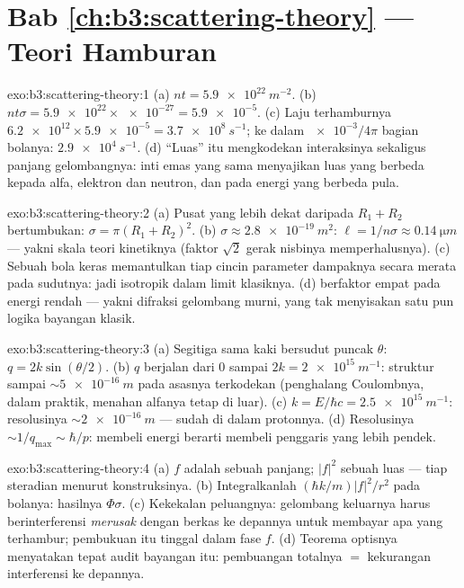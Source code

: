 \section*{Bab \ref{ch:b3:scattering-theory} --- Teori Hamburan}

\begin{solution}{exo:b3:scattering-theory:1}
(a) $nt = \qty{5.9e22}{m^{-2}}$. (b) $nt\sigma = \num{5.9e22}
\times \num{e-27} = \num{5.9e-5}$. (c) Laju terhamburnya
$\num{6.2e12} \times \num{5.9e-5} = \qty{3.7e8}{s^{-1}}$; ke dalam
$\num{e-3}/4\pi$ bagian bolanya: $\qty{2.9e4}{s^{-1}}$. (d) ``Luas''
itu mengkodekan interaksinya sekaligus panjang gelombangnya: inti emas
yang sama menyajikan luas yang berbeda kepada alfa, elektron dan
neutron, dan pada energi yang berbeda pula.
\end{solution}

\begin{solution}{exo:b3:scattering-theory:2}
(a) Pusat yang lebih dekat daripada $R_1 + R_2$ bertumbukan: $\sigma = \pi(R_1 +
R_2)^2$. (b) $\sigma \approx \qty{2.8e-19}{m^2}$: $\ell = 1/n\sigma
\approx \qty{0.14}{\micro m}$ --- yakni skala teori kinetiknya (faktor
$\sqrt2$ gerak nisbinya memperhalusnya). (c) Sebuah bola keras
memantulkan tiap cincin parameter dampaknya secara merata pada sudutnya:
jadi isotropik dalam limit klasiknya. (d)  berfaktor
empat pada energi rendah --- yakni difraksi gelombang murni, yang tak
menyisakan satu pun logika bayangan klasik.
\end{solution}

\begin{solution}{exo:b3:scattering-theory:3}
(a) Segitiga sama kaki bersudut puncak $\theta$: $q =
2k\sin(\theta/2)$. (b) $q$ berjalan dari $0$ sampai $2k = \qty{2e15}{
m^{-1}}$: struktur sampai $\sim\qty{5e-16}{m}$ pada asasnya terkodekan
(penghalang Coulombnya, dalam praktik, menahan alfanya tetap di luar).
(c) $k = E/\hbar c = \qty{2.5e15}{m^{-1}}$: resolusinya
$\sim\qty{2e-16}{m}$ --- sudah di dalam protonnya. (d) Resolusinya
$\sim 1/q_{\max} \sim \hbar/p$: membeli energi berarti membeli penggaris
yang lebih pendek.
\end{solution}

\begin{solution}{exo:b3:scattering-theory:4}
(a) $f$ adalah sebuah panjang; $|f|^2$ sebuah luas --- tiap steradian
menurut konstruksinya. (b) Integralkanlah $(\hbar k/m)|f|^2/r^2$ pada
bolanya: hasilnya $\Phi\sigma$. (c) Kekekalan peluangnya: gelombang
keluarnya harus berinterferensi \emph{merusak} dengan berkas ke depannya
untuk membayar apa yang terhambur; pembukuan itu tinggal dalam fase $f$.
(d) Teorema optisnya menyatakan tepat audit bayangan itu: pembuangan
totalnya $=$ kekurangan interferensi ke depannya.
\end{solution}

